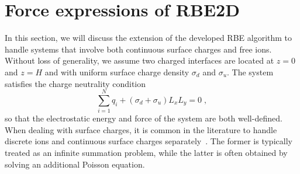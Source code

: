 

\section{Force expressions of RBE2D}\label{app::surfacecharge}

In this section, we will discuss the extension of the developed RBE algorithm to handle systems that involve both continuous surface charges and free ions. Without loss of generality, we assume two charged interfaces are located at $z=0$ and $z=H$ and with uniform surface charge density $\sigma_d$ and $\sigma_u$. The system satisfies the charge neutrality condition \begin{equation}\label{eq::chargeneutrality}
    \sum_{i=1}^N q_i+(\sigma_d+\sigma_u)L_xL_y=0\;,
\end{equation}
so that the electrostatic energy and force of the system are both well-defined. When dealing with surface charges, it is common in the literature to handle discrete ions and continuous surface charges separately~\cite{spohr1997effect,yi2017note,yuan2021particle}. The former is typically treated as an infinite summation problem, while the latter is often obtained by solving an additional Poisson equation. %

